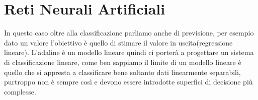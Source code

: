 %
%
%

\chapter{Reti Neurali Artificiali}
In questo caso oltre alla classificazione parliamo anche di previsione, per esempio dato un valore l'obiettivo è quello di stimare il valore in uscita(regressione lineare).  L'adaline è un modello lineare quindi ci porterà a progettare un sistema di classificazione lineare, come ben sappiamo il limite di un modello lineare è quello che si appresta a classificare bene soltanto dati linearmente separabili, purtroppo non è sempre così e devono essere introdotte superfici di decisione più complesse. 

